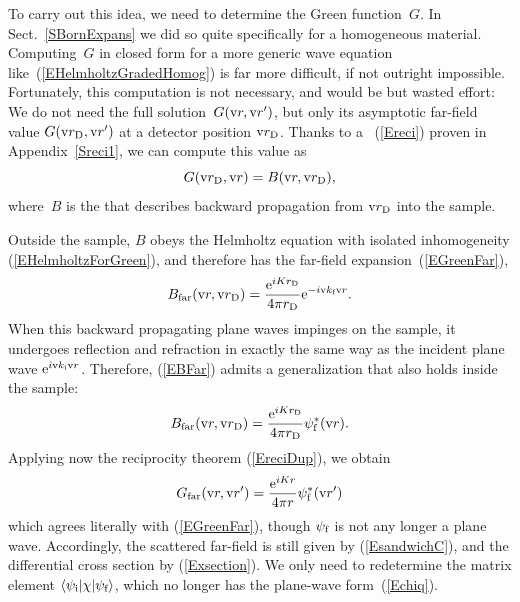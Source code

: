 To carry out this idea, we need to determine the Green function~$G$.
%
In Sect.~\ref{SBornExpans} we did so quite specifically
for a homogeneous material.
Computing~$G$ in closed form for a more generic wave equation
like~(\ref{EHelmholtzGradedHomog}) is far more difficult,
if not outright impossible.
Fortunately, this computation is not necessary,
and would be but wasted effort:
We do not need the full solution~$G(\text{v}{r},\text{v}{r}')$,
but only its asymptotic far-field value $G(\text{v}{r}_\text{D},\text{v}{r}')$
at a detector position $\text{v}{r}_\text{D}$.
%
Thanks to a ~(\ref{Ereci})
%
proven in Appendix~\ref{Sreci1},
we can compute this value
as
\begin{equation}\label{EreciDup}
  G(\text{v}{r}_\text{D},\text{v}{r}) = B(\text{v}{r},\text{v}{r}_\text{D}),
\end{equation}
%
where~$B$ is the 
that describes backward propagation from $\text{v}{r}_\text{D}$ into the sample.

Outside the sample,
$B$ obeys the Helmholtz equation
with isolated inhomogeneity (\ref{EHelmholtzForGreen}),
and therefore has the far-field expansion~(\ref{EGreenFar}),
%
\begin{equation}\label{EBFar}
  B_\text{far}(\text{v}{r},\text{v}{r}_\text{D})
  =\frac{\text{e}^{iKr_\text{D}}}{4\pi r_\text{D}}\text{e}^{-i\text{v}{k}_{\text{f}} \text{v}{r}}.
\end{equation}
When this backward propagating plane waves impinges on the sample,
it undergoes reflection and refraction in exactly the same way as
the incident plane wave $\text{e}^{i\text{v}{k}_{\text{i}}\text{v}{r}}$.
Therefore,
 (\ref{EBFar}) admits a generalization that also holds inside the sample:
\begin{equation}\label{EBFull}
  B_\text{far}(\text{v}{r},\text{v}{r}_\text{D})
  = \frac{\text{e}^{iKr_\text{D}}}{4\pi r_\text{D}}\psi^*_{\text{f}}(\text{v}{r}).
\end{equation}
Applying now the reciprocity theorem (\ref{EreciDup}),
we obtain
\begin{equation}\label{EGreenFarDWBA}
  G_\text{far}(\text{v}{r},\text{v}{r}')
  = \frac{\text{e}^{iKr}}{4\pi r}\psi^*_{\text{f}}(\text{v}{r}')
\end{equation}
which agrees literally with (\ref{EGreenFar}),
though $\psi_{\text{f}}$ is not any longer a plane wave.
Accordingly,
the scattered far-field is still given by (\ref{EsandwichC}),
and the differential cross section by (\ref{Exsection}).
We only need to redetermine the matrix element
$\left\langle \psi_{\text{i}}|\chi|\psi_{\text{f}}\right\rangle$,
which no longer has the plane-wave form~(\ref{Echiq}).

